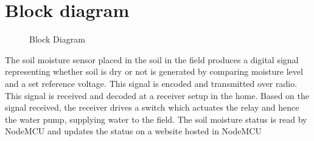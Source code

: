 \chapter{Block diagram}

\begin{figure}[ht]
	\centering
	\caption{Block Diagram}
\end{figure}

The soil moisture sensor placed in the soil in the field produces a
digital signal representing whether soil is dry or not is generated
by comparing moisture level and a set reference voltage. This signal
is encoded and transmitted over radio. This signal is received and
decoded at a receiver setup in the home. Based on the signal
received, the receiver drives a switch which actuates the relay and
hence the water pump, supplying water to the field. The soil moisture
status is read by NodeMCU and updates the status on a website hosted in NodeMCU
